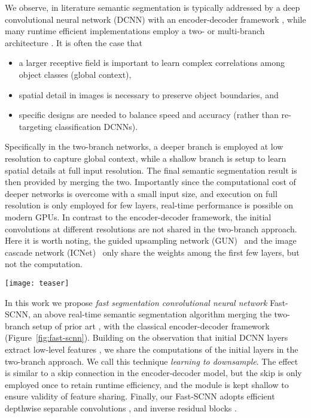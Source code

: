 \documentclass[10pt,twocolumn,letterpaper]{article}
\begin{document}
We observe, in literature semantic segmentation is typically addressed by a deep convolutional neural network (DCNN) with an encoder-decoder framework \cite{fcn-long2016,segnet-badrinarayanan2017}, while many runtime efficient implementations employ a two- or multi-branch architecture \cite{contextnet-poudel2018,BiSeNet-yu2018,gun-mazzini2018}. It is often the case that
\begin{itemize}
  \item{a larger receptive field is important to learn complex correlations among object classes (\ie global context),}
  \item{spatial detail in images is necessary to preserve object boundaries, and}
  \item{specific designs are needed to balance speed and accuracy (rather than re-targeting classification DCNNs).}
\end{itemize}
Specifically in the two-branch networks, a deeper branch is employed at low resolution to capture global context, while a shallow branch is setup to learn spatial details at full input resolution. The final semantic segmentation result is then provided by merging the two. Importantly since the computational cost of deeper networks is overcome with a small input size, and execution on full resolution is only employed for few layers, real-time performance is possible on modern GPUs. In contrast to the encoder-decoder framework, the initial convolutions at different resolutions are not shared in the two-branch approach. Here it is worth noting, the guided upsampling network (GUN)~\cite{gun-mazzini2018} and the image cascade network (ICNet)~\cite{icnet-zhao2017b} only share the weights among the first few layers, but not the computation.

\begin{figure*}[t]
\begin{center}
   \texttt{[image: teaser]}
\end{center}
\caption{Fast-SCNN shares the computations between two branches (encoder) to build a above real-time semantic segmentation network.}
\label{fig:fast-scnn}
\end{figure*}
In this work we propose \textit{fast segmentation convolutional neural network} Fast-SCNN, an above real-time semantic segmentation algorithm merging the two-branch setup of prior art \cite{contextnet-poudel2018,BiSeNet-yu2018,gun-mazzini2018,icnet-zhao2017b}, with the classical encoder-decoder framework \cite{fcn-long2016,segnet-badrinarayanan2017} (Figure~\ref{fig:fast-scnn}). Building on the observation that initial DCNN layers extract low-level features \cite{deconv-zeiler2014,olah2017}, we share the computations of the initial layers in the two-branch approach. We call this technique \textit{learning to downsample}. The effect is similar to a skip connection in the encoder-decoder model, but the skip is only employed once to retain runtime efficiency, and the module is kept shallow to ensure validity of feature sharing. Finally, our Fast-SCNN adopts efficient depthwise separable convolutions \cite{depthwise-conv-sifre2014,mobilenet-howard2017}, and inverse residual blocks \cite{inverted-res-bottlenecks-sandler2018}.
\end{document}
